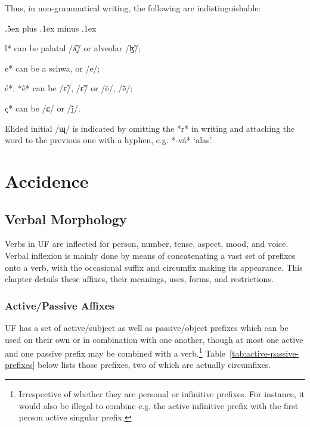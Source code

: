 \documentclass[a4paper, 12pt, oneside, final]{article}
\begin{document}
\noindent Thus, in non-grammatical writing, the following are indistinguishable:
\begin{items}\itemsep .5ex plus .1ex minus .1ex\relax
\item *l* can be palatal /ʎ̝̃/ or alveolar /ɮ̃/;
\item *e* can be a schwa, or /e/;
\item *é*, *ê* can be /ɛ̃/, /ɛ̃̃/ or /ẽ/, /ẽ̃/;
\item *ç* can be /ɕ/ or /j̊/.
\end{items}

\noindent Elided initial /ɰ/ is indicated by omitting the *r* in writing and attaching the word to the previous one with a hyphen,
e.g. *-vá* ‘alas’.

\section{Accidence}\label{sec:accidence}
\subsection{Verbal Morphology}\label{subsec:verbal-morphology}
Verbs in UF are inflected for person, number, tense, aspect, mood, and voice. Verbal inflexion is mainly done
by means of concatenating a vast set of prefixes onto a verb, with the occasional suffix and circumfix making
its appearance. This chapter details these affixes, their meanings, uses, forms, and restrictions.


\subsubsection{Active/Passive Affixes}\label{subsubsec:active-passive-affixes}
UF has a set of active/subject as well as passive/object prefixes which can be used on their own or in combination
with one another, though at most one active and one passive prefix may be combined with a verb.\footnote{Irrespective
of whether they are personal or infinitive prefixes. For instance, it would also be illegal to combine e.g. the active
infinitive prefix with the first person active singular prefix.} Table~\ref{tab:active-passive-prefixes}
below lists those prefixes, two of which are actually circumfixes.
\end{document}
